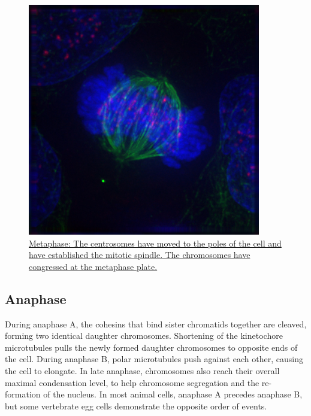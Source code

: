 \begin{figure}

{\centering \includegraphics[width=0.7\linewidth]{./figures/reproduction/MetaphaseIF} 

}

\caption{\href{https://commons.wikimedia.org/wiki/File:MetaphaseIF.jpg}{Metaphase: The centrosomes have moved to the poles of the cell and have established the mitotic spindle. The chromosomes have congressed at the metaphase plate.}}\label{fig:metaphase}
\end{figure}

\hypertarget{anaphase}{%
\subsection{Anaphase}\label{anaphase}}

During anaphase A, the cohesins that bind sister chromatids together are cleaved, forming two identical daughter chromosomes. Shortening of the kinetochore microtubules pulls the newly formed daughter chromosomes to opposite ends of the cell. During anaphase B, polar microtubules push against each other, causing the cell to elongate. In late anaphase, chromosomes also reach their overall maximal condensation level, to help chromosome segregation and the re-formation of the nucleus. In most animal cells, anaphase A precedes anaphase B, but some vertebrate egg cells demonstrate the opposite order of events.



